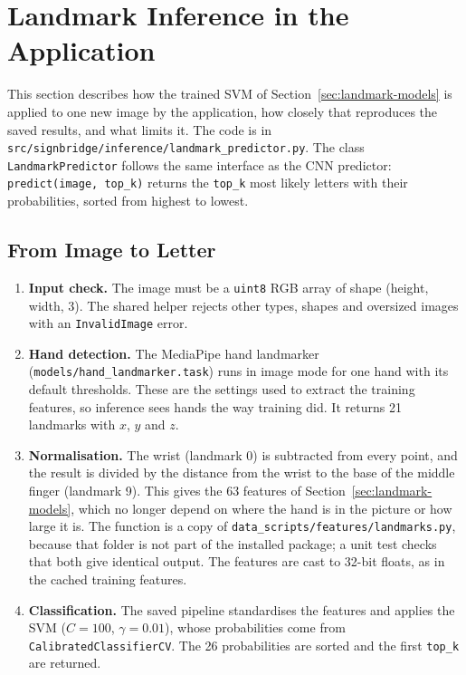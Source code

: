 \section{Landmark Inference in the Application}
\label{sec:landmark-inference}

This section describes how the trained SVM of Section~\ref{sec:landmark-models} is applied to one new image by the application, how closely that reproduces the saved results, and what limits it. The code is in \texttt{src/signbridge/inference/landmark\_predictor.py}. The class \texttt{LandmarkPredictor} follows the same interface as the CNN predictor: \texttt{predict(image, top\_k)} returns the \texttt{top\_k} most likely letters with their probabilities, sorted from highest to lowest.

\subsection{From Image to Letter}

\begin{enumerate}
\item \textbf{Input check.} The image must be a \texttt{uint8} RGB array of shape (height, width, 3). The shared helper rejects other types, shapes and oversized images with an \texttt{InvalidImage} error.
\item \textbf{Hand detection.} The MediaPipe hand landmarker (\texttt{models/hand\_landmarker.task}) runs in image mode for one hand with its default thresholds. These are the settings used to extract the training features, so inference sees hands the way training did. It returns 21 landmarks with $x$, $y$ and $z$.
\item \textbf{Normalisation.} The wrist (landmark 0) is subtracted from every point, and the result is divided by the distance from the wrist to the base of the middle finger (landmark 9). This gives the 63 features of Section~\ref{sec:landmark-models}, which no longer depend on where the hand is in the picture or how large it is. The function is a copy of \texttt{data\_scripts/features/landmarks.py}, because that folder is not part of the installed package; a unit test checks that both give identical output. The features are cast to 32-bit floats, as in the cached training features.
\item \textbf{Classification.} The saved pipeline standardises the features and applies the SVM ($C=100$, $\gamma=0.01$), whose probabilities come from \texttt{CalibratedClassifierCV}. The 26 probabilities are sorted and the first \texttt{top\_k} are returned.
\end{enumerate}

